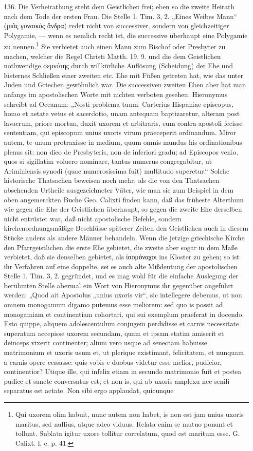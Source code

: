 136. Die Verheirathung steht dem Geistlichen frei; eben so die zweite Heirath nach dem Tode der ersten Frau. Die Stelle 1. Tim. 3, 2. „Eines Weibes Mann“ (μιᾶς γυναικὸς ἄνδρα) redet nicht von successiver, sondern
von gleichzeitiger Polygamie, — wenn es nemlich recht ist, die successive überhaupt eine Polygamie zu nennen.\footnote{Qui uxorem olim habuit, nunc autem non habet, is non est jam unius uxoris maritus, sed nullius, atque adeo viduus. Relata enim se mutuo ponunt et tollunt. Sublata igitur uxore tollitur correlatum, quod est maritum esse. G. Calixt. l. c. p. 41.} Sie verbietet auch einen Mann zum Bischof oder Presbyter zu machen, welcher die Regel Christi Matth. 19, 9. und die dem Geistlichen nothwendige σεμνότης durch willkürliche Auflösung (Scheidung) der Ehe und lüsternes Schließen einer zweiten etc. Ehe mit Füßen getreten hat, wie das unter Juden und Griechen gewöhnlich war. Die successiven zweiten Ehen aber hat man anfangs im apostolischen Worte mit nichten verboten gesehen. Hieronymus schreibt ad Oceanum: „Nosti problema tuum. Carterius Hispaniae episcopus, homo et aetate vetus et sacerdotio, unam antequam baptizaretur, alteram post lavacrum, priore mortua, duxit uxorem et arbitraris, eum contra apostoli fecisse sententiam, qui episcopum unius uxoris virum praeceperit ordinandum. Miror autem, te unum protraxisse in medium, quum omnis mundus his ordinationibus plenus sit: non dico de Presbyteris, non de inferiori gradu; ad Episcopos venio, quos si sigillatim voluero nominare, tantus numerus congregabitur, ut Ariminiensis synodi (quae numerosissima fuit) multitudo superetur.“ Solche historische Thatsachen beweisen noch mehr, als die von den Thatsachen absehenden Urtheile ausgezeichneter Väter, wie man sie zum Beispiel
in dem oben angemerckten Buche Geo. Calixti finden kann, daß das früheste Alterthum wie gegen die Ehe der Geistlichen überhaupt, so gegen die zweite Ehe derselben nicht entrüstet war, daß nicht apostolische Befehle, sondern kirchenordnungsmäßige Beschlüsse späterer Zeiten den Geistlichen auch in diesem Stücke anders als andere Männer behandeln. Wenn die jetzige griechische Kirche den Pfarrgeistlichen die erste Ehe gebietet, die zweite aber sogar in dem Maße verbietet, daß sie denselben gebietet, als ἰσομόναχοι ins Kloster zu gehen; so ist ihr Verfahren auf eine doppelte, sei es auch alte Mißdeutung der apostolischen Stelle 1. Tim. 3, 2. gegründet, und es mag wohl für die einfache Auslegung der berühmten Stelle abermal ein Wort von Hieronymus ihr gegenüber angeführt werden: „Quod ait Apostolus „unius uxoris vir“, sic intellegere debemus, ut non omnem monogamum digamo putemus esse meliorem: sed quo is possit ad monogamiam et continentiam cohortari, qui sui exemplum praeferat in docendo. Esto quippe, aliquem adolescentulum conjugem perdidisse et carnis necessitate superatum accepisse uxorem secundam, quam et ipsam statim amiserit et deinceps vixerit continenter; alium vero usque ad senectam habuisse matrimonium et uxoris usum et, ut plerique existimant, felicitatem, et nunquam a carnis opere cessasse: quis vobis e duobus videtur esse melior, pudicior, continentior? Utique ille, qui infelix etiam in secundo matrimonio fuit et postea pudice et sancte conversatus est; et non is, qui ab uxoris amplexu nec senili separatus est aetate. Non sibi ergo applaudat, quicunque
